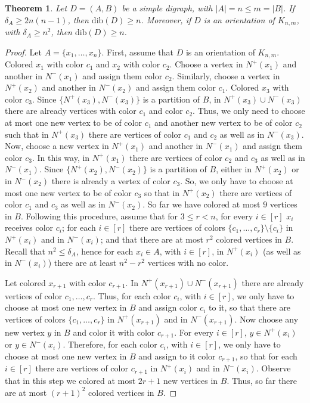 \documentclass[12pt]{article}
\newtheorem{theorem}{Theorem}
\begin{document}
\begin{theorem} Let $D =(A, B)$ be a simple 
digraph, with $|A| = n\leq m= |B|$.  If $\delta_A\geq 2n(n-1)$, then $\text{dib}(D)\geq n$. Moreover, if $D$ is an orientation of  $K_{n,m}$, with $\delta_A\geq n^2$, then $\text{dib}(D)\geq n$.
\end{theorem}
\begin{proof} Let  $A=\{x_1, \dots, x_n\}$. First, assume that  $D$ is an orientation of $K_{n,m}$. Colored $x_1$ with color $c_1$ and $x_2$ with color $c_2$. Choose a vertex in $N^+(x_1)$ and another in $N^-(x_1)$  and assign them color $c_2$. Similarly, choose a vertex in $N^+(x_2)$ and another in $N^-(x_2)$  and assign them color $c_1$. 
Colored $x_3$ with color $c_3$. Since $\{N^+(x_3),N^-(x_3)\}$ is a partition of $B$, in $N^+(x_3) \cup N^-(x_3)$ there are already vertices with color $c_1$ and color $c_2$. Thus, we only need to choose at most one new vertex to be of color $c_1$ and another new vertex to be of color $c_2$ such that in $N^+(x_3)$ there are vertices of color $c_1$ and $c_2$ as well as in $N^-(x_3)$. Now, choose a new vertex in $N^+(x_1)$ and another in $N^-(x_1)$  and assign them color $c_3$. In this way, in $N^+(x_1)$ there are vertices of color $c_2$ and $c_3$ as well as in $N^-(x_1)$. Since $\{N^+(x_2),N^-(x_2)\}$ is a partition of $B$, either in $N^+(x_2)$ or in $N^-(x_2)$  there is already a vertex of color $c_3$. So, we only have to choose at most one new vertex to be of color $c_3$ so that in $N^+(x_2)$ there are vertices of color $c_1$ and $c_3$ as well as in $N^-(x_2)$. So far we have colored at most $9$ vertices in $B$. 
Following this procedure, assume that for $3\leq r<n$, for every $i\in [r]$ $x_i$ receives color $c_i$; for each $i\in[r]$ there are vertices of colors $\{c_1, \dots, c_r\}\setminus\{c_i\}$ in $N^+(x_i)$ and in $N^-(x_i)$; and that there are at most $ r^2$ colored vertices in $B$. Recall that $n^2 \leq \delta_A$, hence for each $x_i\in A$, with $i\in [r]$, in $N^+(x_i)$ (as well as in $N^-(x_i)$) there are at least $n^2-r^2$ vertices with no color. 

Let colored $x_{r+1}$ with color $c_{r+1}$. In  $N^+(x_{r+1})\cup N^-(x_{r+1})$ there are already vertices of color $c_1,\dots, c_{r}$. Thus, for each color $c_i$, with $i\in[r]$, we only have to choose at most  one new vertex in $B$ and  assign color $c_i$ to it, so that there are vertices of colors $\{c_1, \dots, c_r\}$ in $N^+(x_{r+1})$ and in $N^-(x_{r+1})$. Now choose any new vertex $y$ in $B$ and color it with color $c_{r+1}$. For every $i\in [r]$, $y\in N^+(x_i)$ or $y\in N^-(x_i)$. Therefore, for each color $c_i$, with $i\in[r]$, we only have to choose at most  one new vertex in $B$ and  assign to it color $c_{r+1}$, so that
for each $i\in[r]$ there are vertices of color $c_{r+1}$ in $N^+(x_i)$ and in $N^-(x_i)$. Observe that in this step we colored at most $2r+1$ new vertices in $B$. 
Thus, so far there are at most $(r+1)^2$ colored vertices in $B$. 


\end{proof}
\end{document}
